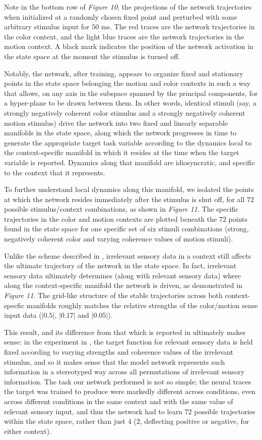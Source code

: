 \documentclass[12pt,a4paper,final]{iopart}
\begin{document}
Note in the bottom row of \emph{Figure 10}; the projections of the network trajectories when initialized at a randomly chosen fixed point and perturbed with some arbitrary stimulus input for $50$ ms. The red traces are the network trajectories in the color context, and the light blue traces are the network trajectories in the motion context. A black mark indicates the position of the network activation in the state space at the moment the stimulus is turned off. 

Notably, the network, after training, appears to organize fixed and stationary points in the state space belonging the motion and color contexts in such a way that allows, on any axis in the subspace spanned by the principal components, for a hyper-plane to be drawn between them. In other words, identical stimuli (say, a strongly negatively coherent color stimulus and a strongly negatively coherent motion stimulus) drive the network into two fixed and linearly separable manifolds in the state space, along which the network progresses in time to generate the appropriate target task variable according to the dynamics local to the context-specific manifold in which it resides at the time when the target variable is reported. Dynamics along that manifold are idiosyncratic, and specific to the context that it represents.

To further understand local dynamics along this manifold, we isolated the points at which the network resides immediately after the stimulus is shut off, for all $72$ possible stimulus/context combinations, as shown in \emph{Figure 11}. The specific trajectories in the color and motion contexts are plotted beneath the $72$ points found in the state space for one specific set of six stimuli combinations (strong, negatively coherent color and varying coherence values of motion stimuli).

Unlike the scheme described in \cite{Mante2013}, irrelevant sensory data in a context still affects the ultimate trajectory of the network in the state space. In fact, irrelevant sensory data ultimately determines (along with relevant sensory data) where along the context-specific manifold the network is driven, as demonstrated in \emph{Figure 11}. The grid-like structure of the stable trajectories across both context-specfic manifolds roughly matches the relative strengths of the color/motion sense input data ($|0.5|$, $|0.17|$ and $|0.05|$).

This result, and its difference from that which is reported in \cite{Mante2013} ultimately makes sense: in the experiment in \cite{Mante2013}, the target function for relevant sensory data is held fixed according to varying strengths and coherence values of the irrelevant stimulus, and so it makes sense that the model network represents such information in a stereotyped way across all permutations of irrelevant sensory information. The task our network performed is not so simple; the neural traces the target was trained to produce were markedly different across conditions, even across different conditions in the same context and with the same value of relevant sensory input, and thus the network had to learn $72$ possible trajectories within the state space, rather than just $4$ ($2$, deflecting positive or negative, for either context).
\end{document}
